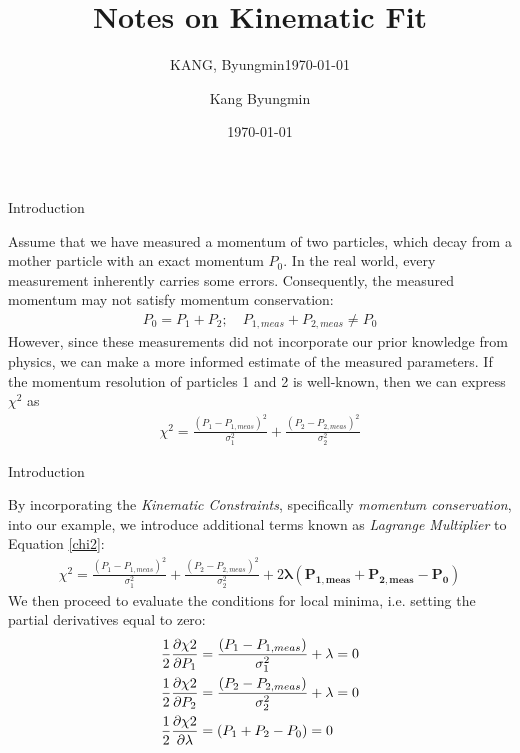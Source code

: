 \documentclass[
	xcolor=dvipsnames,
	10pt, 
	]{beamer}
\title[]{Notes on Kinematic Fit}
\author[Author]{Kang Byungmin}
\institute{Korea University}
\date{\today}
\subtitle{KANG, Byungmin\footnotemark[1]\newline\today}
\begin{document}
\begin{frame}[t,plain] %
       \titlepage
\end{frame}
\begin{frame}{Introduction}
	\begin{block}{}
	Assume that we have measured a momentum of two particles, which decay from a mother particle with an exact momentum $P_0$. In the real world, every measurement inherently carries some errors. Consequently, the measured momentum may not satisfy momentum conservation:
	\begin{align}
	P_{0}=P_{1}+P_{2};\quad P_{1,meas}+P_{2,meas}\neq P_{0} 
	\end{align}
	However, since these measurements did not incorporate our prior knowledge from physics, we can make a more informed estimate of the measured parameters. If the momentum resolution of particles 1 and 2 is well-known, then we can express $\chi^2$ as
	\begin{align}
		\chi^2= \frac{(P_{1}-P_{1,meas})^2}{\sigma_1^2}+\frac{(P_{2}-P_{2,meas})^2}{\sigma_2^2}\label{chi2}
	\end{align}
	\end{block}
\end{frame}
\begin{frame}{Introduction}
	\begin{block}{}
		By incorporating the \textit{Kinematic Constraints}, specifically \textit{momentum conservation}, into our example, we introduce additional terms known as \textit{Lagrange Multiplier} to Equation \eqref{chi2}:
		\vspace{-5 mm}
		\begin{align}
			\chi^2= \frac{(P_{1}-P_{1,meas})^2}{\sigma_1^2}+\frac{(P_{2}-P_{2,meas})^2}{\sigma_2^2}\label{chi2} + 2\mathbf{\lambda(P_{1,meas}+P_{2,meas}-P_0)}
		\end{align} 
		We then proceed to evaluate the conditions for local minima, i.e. setting the partial derivatives equal to zero:
		\begin{align}
			\frac{1}{2}\frac{\partial \chi2}{\partial P_{1}}&=\frac{(P_{1}-P_{1,meas})}{\sigma_1^2}+\lambda=0\label{dxd1}\\
			\frac{1}{2}\frac{\partial \chi2}{\partial P_{2}}&=\frac{(P_{2}-P_{2,meas})}{\sigma_2^2}+\lambda=0\label{dxd2}
			\\
			\frac{1}{2}\frac{\partial \chi2}{\partial \lambda}&=(P_{1}+P_{2}-P_0)=0\label{dxdl}
		\end{align}
	\end{block}
\end{frame}
\end{document}

